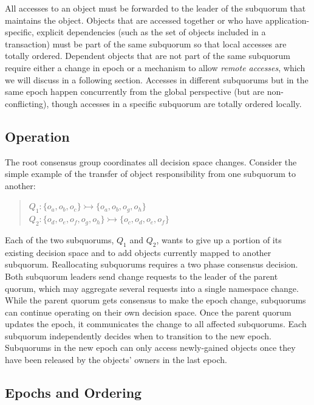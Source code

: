 \documentclass[11pt,letterpaper]{article}
\begin{document}
All accesses to an object must be forwarded to the leader of the subquorum that maintains
the object.
Objects that are accessed together or who have application-specific, explicit
dependencies (such as the set of objects included in a transaction) must be part of the
same subquorum so that local accesses are totally ordered.
Dependent objects that are not part of the same subquorum require either a change in
epoch or a mechanism to allow \emph{remote accesses}, which we will discuss in a
following section.
Accesses in different subquorums but in the same epoch happen concurrently
from the global perspective (but are non-conflicting), though accesses in a
specific subquorum are totally ordered locally.

\subsection{Operation}
\vspace{-.5em}

The root consensus group coordinates all decision space changes.
Consider the simple example of the transfer of object responsibility from one subquorum
to another:

\begin{quote}
\small
   $Q_1: \{o_a,o_b,o_c\} \rightarrowtail \{o_a,o_b,o_g,o_h\}$\\
   $Q_2: \{o_d,o_e,o_f,o_g,o_h\} \rightarrowtail \{o_c,o_d,o_e,o_f\}$
\end{quote}

Each of the two subquorums, $Q_1$ and $Q_2$, wants to give up a portion of its
existing decision space and to add objects currently mapped to another subquorum.
Reallocating subquorums requires a two phase consensus decision.
Both subquorum leaders send change requests to the leader of the parent quorum, which may
aggregate several requests into a single namespace change.
While the parent quorum gets consensus to make the epoch change, subquorums can continue
operating on their own decision space.
Once the parent quorum updates the epoch, it communicates the change to all affected
subquorums.
Each subquorum independently decides when to transition to the new epoch.
Subquorums in the new epoch can only access newly-gained objects once they have been
released by the objects' owners in the last epoch.

\subsection{Epochs and Ordering}
\vspace{-.5em}
\end{document}
